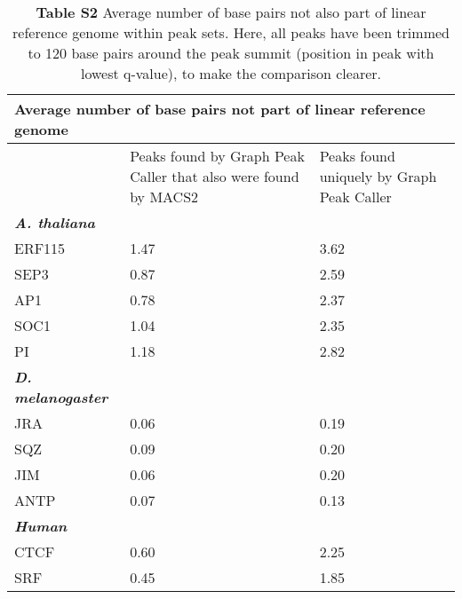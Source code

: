 \documentclass[a4paper,8pt]{article}
\title{}
\author{}
\begin{document}
\begin{table}[!ht]
\begin{adjustwidth}{-1.25in}{0in} %
\centering
\caption*{\textbf{Table S2} Average number of base pairs not also part of linear reference genome within peak sets. Here, all peaks have been trimmed to 120 base pairs around the peak summit (position in peak with lowest q-value), to make the comparison clearer.}
\label{tableS2}
\begin{tabularx}{1.6\textwidth}{b|X|X}
  \multicolumn{3}{l}{\textbf{Average number of base pairs not part of linear reference genome}} \\ \hline
\toprule
   & Peaks found by Graph Peak Caller that also were found by MACS2 & Peaks found uniquely by Graph Peak Caller\\
  \emph{\textbf{A. thaliana}} & & \\ \hline
  ERF115 & 1.47 & 3.62 \\
  SEP3 & 0.87 & 2.59 \\
  AP1 & 0.78 & 2.37 \\
  SOC1 & 1.04 & 2.35 \\
  PI & 1.18 & 2.82 \\ \hline
  
  \emph{\textbf{D. melanogaster}} & & \\ \hline
  JRA & 0.06 & 0.19 \\
  SQZ & 0.09 & 0.20 \\
  JIM & 0.06 & 0.20\\
  ANTP & 0.07 & 0.13 \\
  
  \emph{\textbf{Human}} & & \\ \hline
  CTCF & 0.60 & 2.25 \\
  SRF & 0.45 & 1.85 \\
  
  
  
\bottomrule
\end{tabularx}
\end{adjustwidth}
\end{table}
\end{document}
